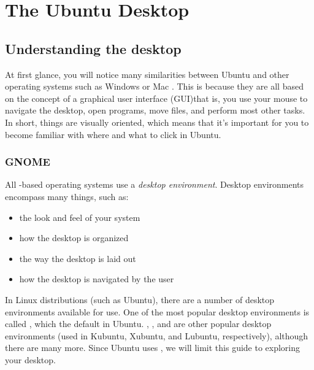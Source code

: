 
\chapter{The Ubuntu Desktop}
\label{ch:the-ubuntu-desktop}

\section{Understanding the desktop}
At first glance, you will notice many similarities between Ubuntu and other operating systems such as Windows or Mac . This is because they are all based on the concept of a graphical user interface (\gls{GUI})\dash that is, you use your mouse to navigate the desktop, open programs, move files, and perform most other tasks. In short, things are visually oriented, which means that it's important for you to become familiar with where and what to click in Ubuntu. 

\subsection{GNOME}
All -based operating systems use a \emph{desktop environment}. Desktop environments encompass many things, such as:
\begin{itemize}
  \item the look and feel of your system
  \item how the desktop is organized
  \item the way the desktop is laid out
  \item how the desktop is navigated by the user
\end{itemize}
In Linux distributions (such as Ubuntu), there are a number of desktop environments available for use. One of the most popular desktop environments is called , which the default in Ubuntu.  , , and  are other popular desktop environments (used in Kubuntu, Xubuntu, and Lubuntu, respectively), although there are many more. Since Ubuntu uses , we will limit this guide to exploring your  desktop.

